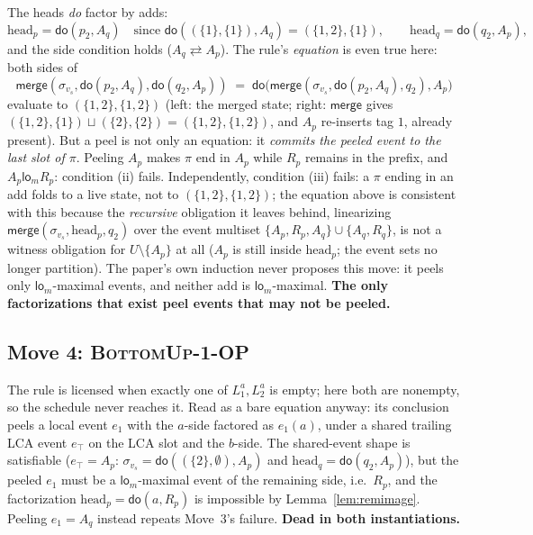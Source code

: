 \documentclass[11pt]{article}
\newcommand{\comm}{\rightleftarrows}
\newcommand{\mergeL}{\mathsf{merge}}
\newcommand{\lom}{\mathsf{lo}_m}
\newcommand{\Ap}{A_p}
\newcommand{\Aq}{A_q}
\newcommand{\Rp}{R_p}
\newcommand{\Rq}{R_q}
\begin{document}
The heads \emph{do} factor by adds:
\[
  \mathrm{head}_p = \mathsf{do}(p_2, \Aq)
  \quad\text{since } \mathsf{do}((\{1\},\{1\}), \Aq) =
  (\{1,2\},\{1\}), \qquad
  \mathrm{head}_q = \mathsf{do}(q_2, \Ap),
\]
and the side condition holds ($\Aq \comm \Ap$). The rule's
\emph{equation} is even true here: both sides of
\[
  \mergeL(\sigma_{v_s}, \mathsf{do}(p_2,\Aq),
  \mathsf{do}(q_2,\Ap))
  \;=\;
  \mathsf{do}\bigl(\mergeL(\sigma_{v_s}, \mathsf{do}(p_2,\Aq), q_2),
  \Ap\bigr)
\]
evaluate to $(\{1,2\},\{1,2\})$ (left: the merged state; right:
$\mergeL$ gives $(\{1,2\},\{1\}) \sqcup (\{2\},\{2\}) =
(\{1,2\},\{1,2\})$, and $\Ap$ re-inserts tag $1$, already present).
But a peel is not only an equation: it \emph{commits the peeled event
to the last slot of $\pi$}. Peeling $\Ap$ makes $\pi$ end in $\Ap$
while $\Rp$ remains in the prefix, and $\Ap \mathrel{\lom} \Rp$:
condition (ii) fails. Independently, condition (iii) fails: a
$\pi$ ending in an add folds to a live state, not to
$(\{1,2\},\{1,2\})$; the equation above is consistent with this
because the \emph{recursive} obligation it leaves behind,
linearizing $\mergeL(\sigma_{v_s}, \mathrm{head}_p, q_2)$ over the
event multiset $\{\Ap,\Rp,\Aq\} \cup \{\Aq,\Rq\}$, is not a witness
obligation for $U \setminus \{\Ap\}$ at all ($\Ap$ is still inside
$\mathrm{head}_p$; the event sets no longer partition). The paper's
own induction never proposes this move: it peels only $\lom$-maximal
events, and neither add is $\lom$-maximal. \textbf{The only
factorizations that exist peel events that may not be peeled.}

\subsection{Move 4: \textsc{BottomUp-1-OP}}

The rule is licensed when exactly one of $L_1^a, L_2^a$ is empty; here
both are nonempty, so the schedule never reaches it. Read as a bare
equation anyway: its conclusion peels a local event $e_1$ with the
$a$-side factored as $e_1(a)$, under a shared trailing LCA event
$e_\top$ on the LCA slot and the $b$-side. The shared-event shape is
satisfiable ($e_\top = \Ap$: $\sigma_{v_s} =
\mathsf{do}((\{2\},\emptyset), \Ap)$ and $\mathrm{head}_q =
\mathsf{do}(q_2, \Ap)$), but the peeled $e_1$ must be a
$\lom$-maximal event of the remaining side, i.e.\ $\Rp$, and the
factorization $\mathrm{head}_p = \mathsf{do}(a, \Rp)$ is impossible by
Lemma~\ref{lem:remimage}. Peeling $e_1 = \Aq$ instead repeats
Move~3's failure. \textbf{Dead in both instantiations.}
\end{document}
